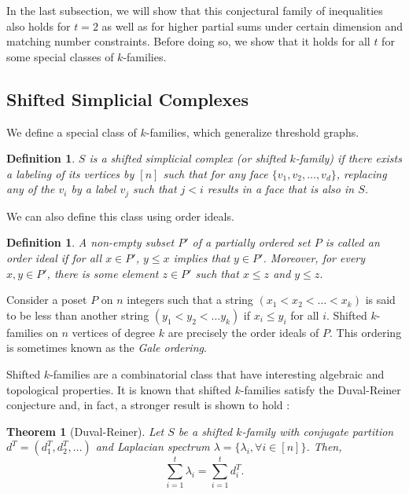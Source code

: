 \documentclass[11pt]{article}
\newtheorem{thm}[lm]{Theorem}
\newtheorem{defi}[lm]{Definition}
\begin{document}
In the last subsection, we will show that this conjectural family of inequalities also holds for $ t = 2$ as well as for higher partial sums under certain dimension and matching number constraints. Before doing so, we show that it holds for all $t$ for some special classes of $k$-families.



\subsection{Shifted Simplicial Complexes}

We define a special class of $k$-families, which generalize threshold graphs.

\begin{defi}
$S$ is a \emph{shifted simplicial complex} (or shifted $k$-family) if there exists a labeling of its vertices by $[n]$ such that for any face $\{v_1, v_2, \ldots, v_d\}$, replacing any of the $v_i$ by a label $v_j$ such that $j < i$ results in a face that is also in $S$.
\end{defi}

We can also define this class using order ideals.

\begin{defi}
A non-empty subset $P'$ of a partially ordered set $P$ is called an \emph{order ideal} if for all $x \in P'$, $y \leq x$ implies that $y \in P'$. Moreover, for every $x, y \in P'$, there is some element $z \in P'$ such that $x \leq z$ and $y \leq z.$

\end{defi}

Consider a poset $P$ on $n$ integers such that a string $(x_1 < x_2 < \ldots < x_k)$ is said to be less than another string $(y_1 < y_2 < \ldots y_k)$ if $x_i \leq y_i$ for all $i$. Shifted $k$-families on $n$ vertices of degree $k$ are precisely the order ideals of $P$. This ordering is sometimes known as the \emph{Gale ordering}.


Shifted $k$-families are a combinatorial class that have interesting algebraic and topological properties. It is known that shifted $k$-families satisfy the Duval-Reiner conjecture and, in fact, a stronger result is shown to hold \cite{DR}:


\begin{thm}[Duval-Reiner]
Let $S$ be a shifted $k$-family with conjugate partition $d^T = (d_1^T, d_2^T, \ldots)$ and Laplacian spectrum $\lambda = \{ \lambda_i, \forall i \in [n]\}$. Then,
$$\sum_{i = 1}^t \lambda_i = \sum_{i = 1}^t d_i^T.$$
\end{thm}
\end{document}
